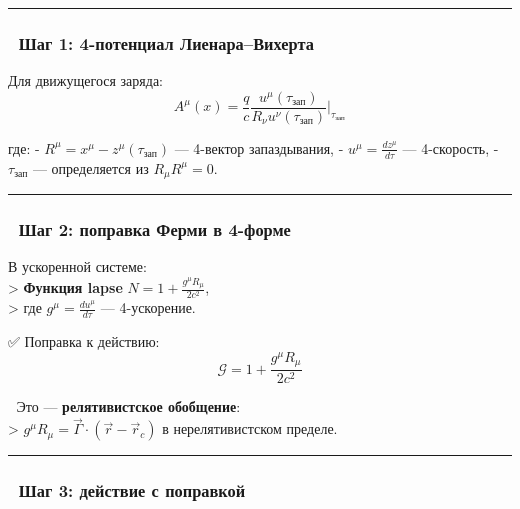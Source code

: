 \documentclass[11pt]{article}
\begin{document}
\begin{center}\rule{0.5\linewidth}{\linethickness}\end{center}

\subsubsection{🔹 Шаг 1: 4-потенциал
Лиенара--Вихерта}\label{ux448ux430ux433-1-4-ux43fux43eux442ux435ux43dux446ux438ux430ux43b-ux43bux438ux435ux43dux430ux440ux430ux432ux438ux445ux435ux440ux442ux430}

Для движущегося заряда: \[
A^\mu(x) = \frac{q}{c} \frac{u^\mu(\tau_{\text{зап}})}{R_\nu u^\nu(\tau_{\text{зап}})} \bigg|_{\tau_{\text{зап}}}
\]

где: - \(R^\mu = x^\mu - z^\mu(\tau_{\text{зап}})\) --- 4-вектор
запаздывания, - \(u^\mu = \frac{dz^\mu}{d\tau}\) --- 4-скорость, -
\(\tau_{\text{зап}}\) --- определяется из \(R_\mu R^\mu = 0\).

\begin{center}\rule{0.5\linewidth}{\linethickness}\end{center}

\subsubsection{🔹 Шаг 2: поправка Ферми в
4-форме}\label{ux448ux430ux433-2-ux43fux43eux43fux440ux430ux432ux43aux430-ux444ux435ux440ux43cux438-ux432-4-ux444ux43eux440ux43cux435}

В ускоренной системе:\\
\textgreater{} \textbf{Функция lapse}
\(N = 1 + \frac{g^\mu R_\mu}{2c^2}\),\\
\textgreater{} где \(g^\mu = \frac{du^\mu}{d\tau}\) --- 4-ускорение.

✅ Поправка к действию: \[
\boxed{
\mathcal{G} = 1 + \frac{g^\mu R_\mu}{2c^2}
}
\]

📌 Это --- \textbf{релятивистское обобщение}:\\
\textgreater{}
\(g^\mu R_\mu = \vec{\Gamma} \cdot (\vec{r} - \vec{r}_c)\) в
нерелятивистском пределе.

\begin{center}\rule{0.5\linewidth}{\linethickness}\end{center}

\subsubsection{🔹 Шаг 3: действие с
поправкой}\label{ux448ux430ux433-3-ux434ux435ux439ux441ux442ux432ux438ux435-ux441-ux43fux43eux43fux440ux430ux432ux43aux43eux439}
\end{document}
